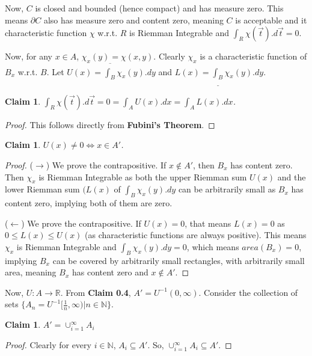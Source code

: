 \documentclass[12pt,a4paper]{article}
\newtheorem{claim}[theorem]{Claim}
\theoremstyle{definition}
\begin{document}
\begin{flushleft}
Now, $C$ is closed and bounded (hence compact) and has measure zero. This means $\partial C$ also has measure zero and content zero, meaning $C$ is acceptable and it characteristic function $\chi$ w.r.t. $R$ is Riemman Integrable and $\int_{R} \chi(\vec{t}).d\vec{t} = 0$.
\medskip

Now, for any $x \in A$, $\chi_x (y) = \chi (x,y)$. Clearly $\chi_x$ is a characteristic function of $B_x$ w.r.t. $B$. Let $U(x)= \overline{\int_{B}} \chi_x (y).dy $ and $L(x)= \underline{\int_{B}} \chi_x (y).dy $.

\begin{claim}
	$\int_{R} \chi(\vec{t}).d\vec{t} = 0 = \int_{A} U(x).dx = \int_{A} L(x).dx$.
\end{claim}

\begin{proof}
	This follows directly from {\bf Fubini's Theorem}.
\end{proof}

\begin{claim}
	$U(x) \ne 0 \iff x \in A'$.
\end{claim}

\begin{proof}
	($\rightarrow$) We prove the contrapositive. If $x \notin A'$, then $B_x$ has content zero. Then $\chi_x$ is Riemman Integrable as both the upper Riemman sum $U(x)$ and the lower Riemman sum $(L(x)$ of $\int_{B} \chi_x (y).dy$ can be arbitrarily small as $B_x$ has content zero, implying both of them are zero.
	
	\medskip
	
	($\leftarrow$) We prove the contrapositive. If $U(x) = 0$, that means $L(x) = 0$ as $0 \le L(x) \le U(x)$ (as characteristic functions are always positive). This means $\chi_x$ is Riemman Integrable and $\int_{B} \chi_x (y).dy = 0$, which means $area (B_x) = 0$, implying $B_x$ can be covered by arbitrarily small rectangles, with arbitrarily small area, meaning $B_x$ has content zero and $x \notin A'$.
\end{proof}

Now, $U:A\to \mathbb{R}$. From {\bf Claim 0.4}, $A' = U^{-1}(0,\infty)$. Consider the collection of sets $\{A_n = U^{-1} [\frac{1}{n},\infty) | n \in \mathbb{N}\}$.

\begin{claim}
	$A' = \cup_{i=1}^{\infty} A_i$
\end{claim}

\begin{proof}
	Clearly for every $i \in \mathbb{N}$, $A_i \subseteq A'$. So, $\cup_{i=1}^{\infty} A_i \subseteq A'$.


\end{proof}
\end{flushleft}
\end{document}
